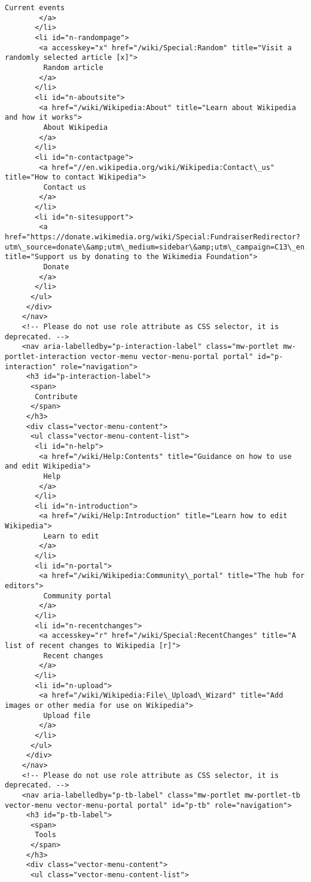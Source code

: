 \documentclass[11pt]{article}
\begin{document}
\begin{Verbatim}[commandchars=\\\{\}]
         Current events
        </a>
       </li>
       <li id="n-randompage">
        <a accesskey="x" href="/wiki/Special:Random" title="Visit a randomly selected article [x]">
         Random article
        </a>
       </li>
       <li id="n-aboutsite">
        <a href="/wiki/Wikipedia:About" title="Learn about Wikipedia and how it works">
         About Wikipedia
        </a>
       </li>
       <li id="n-contactpage">
        <a href="//en.wikipedia.org/wiki/Wikipedia:Contact\_us" title="How to contact Wikipedia">
         Contact us
        </a>
       </li>
       <li id="n-sitesupport">
        <a href="https://donate.wikimedia.org/wiki/Special:FundraiserRedirector?utm\_source=donate\&amp;utm\_medium=sidebar\&amp;utm\_campaign=C13\_en.wikipedia.org\&amp;uselang=en" title="Support us by donating to the Wikimedia Foundation">
         Donate
        </a>
       </li>
      </ul>
     </div>
    </nav>
    <!-- Please do not use role attribute as CSS selector, it is deprecated. -->
    <nav aria-labelledby="p-interaction-label" class="mw-portlet mw-portlet-interaction vector-menu vector-menu-portal portal" id="p-interaction" role="navigation">
     <h3 id="p-interaction-label">
      <span>
       Contribute
      </span>
     </h3>
     <div class="vector-menu-content">
      <ul class="vector-menu-content-list">
       <li id="n-help">
        <a href="/wiki/Help:Contents" title="Guidance on how to use and edit Wikipedia">
         Help
        </a>
       </li>
       <li id="n-introduction">
        <a href="/wiki/Help:Introduction" title="Learn how to edit Wikipedia">
         Learn to edit
        </a>
       </li>
       <li id="n-portal">
        <a href="/wiki/Wikipedia:Community\_portal" title="The hub for editors">
         Community portal
        </a>
       </li>
       <li id="n-recentchanges">
        <a accesskey="r" href="/wiki/Special:RecentChanges" title="A list of recent changes to Wikipedia [r]">
         Recent changes
        </a>
       </li>
       <li id="n-upload">
        <a href="/wiki/Wikipedia:File\_Upload\_Wizard" title="Add images or other media for use on Wikipedia">
         Upload file
        </a>
       </li>
      </ul>
     </div>
    </nav>
    <!-- Please do not use role attribute as CSS selector, it is deprecated. -->
    <nav aria-labelledby="p-tb-label" class="mw-portlet mw-portlet-tb vector-menu vector-menu-portal portal" id="p-tb" role="navigation">
     <h3 id="p-tb-label">
      <span>
       Tools
      </span>
     </h3>
     <div class="vector-menu-content">
      <ul class="vector-menu-content-list">

\end{Verbatim}
\end{document}
